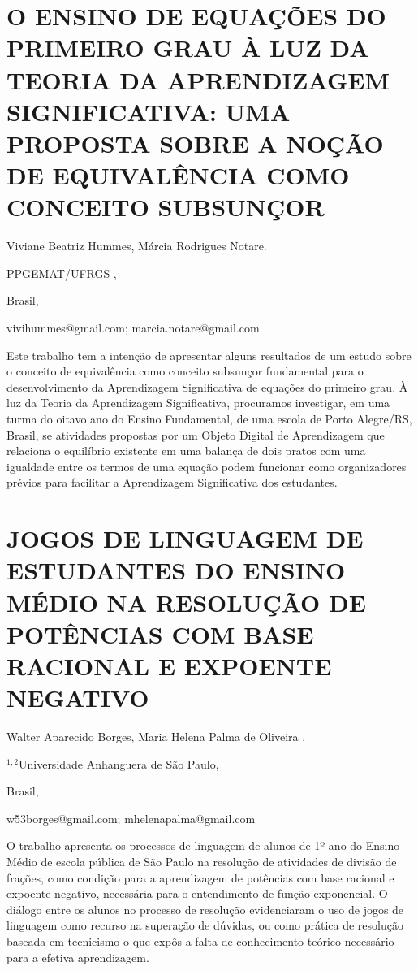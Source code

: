 \section{O ENSINO DE EQUAÇÕES DO PRIMEIRO GRAU À LUZ DA TEORIA DA APRENDIZAGEM
SIGNIFICATIVA: UMA PROPOSTA SOBRE A NOÇÃO DE EQUIVALÊNCIA COMO CONCEITO
SUBSUNÇOR}

\begin{datos}

Viviane Beatriz Hummes, Márcia Rodrigues Notare.

PPGEMAT/UFRGS ,

Brasil,

vivihummes@gmail.com; marcia.notare@gmail.com 

\end{datos}

Este trabalho tem a intenção de apresentar alguns resultados de um
estudo sobre o conceito de equivalência como conceito subsunçor fundamental
para o desenvolvimento da Aprendizagem Significativa de equações do
primeiro grau. À luz da Teoria da Aprendizagem Significativa, procuramos
investigar, em uma turma do oitavo ano do Ensino Fundamental, de uma
escola de Porto Alegre/RS, Brasil, se atividades propostas por um
Objeto Digital de Aprendizagem que relaciona o equilíbrio existente
em uma balança de dois pratos com uma igualdade entre os termos de
uma equação podem funcionar como organizadores prévios para facilitar
a Aprendizagem Significativa dos estudantes. 


\section{JOGOS DE LINGUAGEM DE ESTUDANTES DO ENSINO MÉDIO NA RESOLUÇÃO DE
POTÊNCIAS COM BASE RACIONAL E EXPOENTE NEGATIVO}

\begin{datos}

\textonesuperior{}Walter Aparecido Borges, \texttwosuperior{}Maria
Helena Palma de Oliveira .

$^{1,2}$Universidade Anhanguera de São Paulo,

Brasil,

\textonesuperior{}w53borges@gmail.com; \texttwosuperior{}mhelenapalma@gmail.com 

\end{datos}

O trabalho apresenta os processos de linguagem de alunos de 1º ano
do Ensino Médio de escola pública de São Paulo na resolução de atividades
de divisão de frações, como condição para a aprendizagem de potências
com base racional e expoente negativo, necessária para o entendimento
de função exponencial. O diálogo entre os alunos no processo de resolução
evidenciaram o uso de jogos de linguagem como recurso na superação
de dúvidas, ou como prática de resolução baseada em tecnicismo o que
expôs a falta de conhecimento teórico necessário para a efetiva aprendizagem. 


